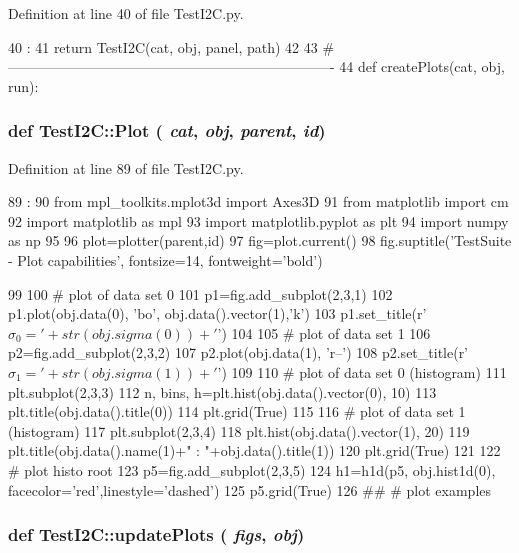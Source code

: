 Definition at line 40 of file TestI2C.py.


\begin{DoxyCode}
40                                 :
41     return TestI2C(cat, obj, panel, path)
42 
43 #----------------------------------------------------------------------
44 
def createPlots(cat, obj, run):
\end{DoxyCode}
\hypertarget{namespaceTestI2C_afd6c6404fd8a975cb2252702f97f4b6b}{
\subsubsection[{Plot}]{\setlength{\rightskip}{0pt plus 5cm}def TestI2C::Plot ( {\em cat}, \/   {\em obj}, \/   {\em parent}, \/   {\em id})}}
\label{namespaceTestI2C_afd6c6404fd8a975cb2252702f97f4b6b}


Definition at line 89 of file TestI2C.py.


\begin{DoxyCode}
89                               :
90     from mpl_toolkits.mplot3d import Axes3D
91     from matplotlib import cm
92     import matplotlib as mpl
93     import matplotlib.pyplot as plt
94     import numpy as np
95 
96     plot=plotter(parent,id)
97     fig=plot.current()
98     fig.suptitle('TestSuite - Plot capabilities', fontsize=14, fontweight='bold')
      
99     
100     # plot of data set 0
101     p1=fig.add_subplot(2,3,1)
102     p1.plot(obj.data(0), 'bo', obj.data().vector(1),'k')
103     p1.set_title(r'$\sigma_0='+str(obj.sigma(0))+'$')
104     
105     # plot of data set 1
106     p2=fig.add_subplot(2,3,2)
107     p2.plot(obj.data(1), 'r--')
108     p2.set_title(r'$\sigma_1='+str(obj.sigma(1))+'$')
109     
110     # plot of data set 0 (histogram)
111     plt.subplot(2,3,3)
112     n, bins, h=plt.hist(obj.data().vector(0), 10)
113     plt.title(obj.data().title(0))    
114     plt.grid(True)
115 
116     # plot of data set 1 (histogram)    
117     plt.subplot(2,3,4)
118     plt.hist(obj.data().vector(1), 20)
119     plt.title(obj.data().name(1)+" : "+obj.data().title(1))
120     plt.grid(True)
121 
122     # plot histo root
123     p5=fig.add_subplot(2,3,5)
124     h1=h1d(p5, obj.hist1d(0), facecolor='red',linestyle='dashed')
125     p5.grid(True)
126 
##     # plot examples
\end{DoxyCode}
\hypertarget{namespaceTestI2C_af22676a658c78e7fbea927dfef0a27ae}{
\subsubsection[{updatePlots}]{\setlength{\rightskip}{0pt plus 5cm}def TestI2C::updatePlots ( {\em figs}, \/   {\em obj})}}
\label{namespaceTestI2C_af22676a658c78e7fbea927dfef0a27ae}


